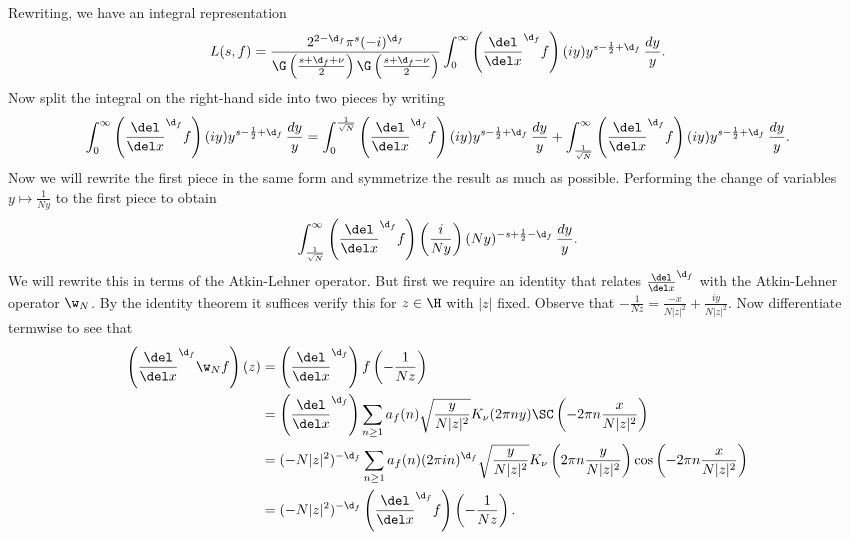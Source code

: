       Rewriting, we have an integral representation
      \begin{equation}\label{equ:integral_representation_Maass_1}
        L(s,f) = \frac{2^{2-\d_{f}}\pi^{s}(-i)^{\d_{f}}}{\G\left(\frac{s+\d_{f}+\nu}{2}\right)\G\left(\frac{s+\d_{f}-\nu}{2}\right)}\int_{0}^{\infty}\left(\frac{\del}{\del x}^{\d_{f}}f\right)(iy)y^{s-\frac{1}{2}+\d_{f}}\,\frac{dy}{y}.
      \end{equation}
      Now split the integral on the right-hand side into two pieces by writing
      \begin{equation}\label{equ:symmetric_integral_Maass_split}
        \int_{0}^{\infty}\left(\frac{\del}{\del x}^{\d_{f}}f\right)(iy)y^{s-\frac{1}{2}+\d_{f}}\,\frac{dy}{y} = \int_{0}^{\frac{1}{\sqrt{N}}}\left(\frac{\del}{\del x}^{\d_{f}}f\right)(iy)y^{s-\frac{1}{2}+\d_{f}}\,\frac{dy}{y}+\int_{\frac{1}{\sqrt{N}}}^{\infty}\left(\frac{\del}{\del x}^{\d_{f}}f\right)(iy)y^{s-\frac{1}{2}+\d_{f}}\,\frac{dy}{y}.
      \end{equation}
      Now we will rewrite the first piece in the same form and symmetrize the result as much as possible. Performing the change of variables $y \mapsto \frac{1}{Ny}$ to the first piece to obtain
      \[
        \int_{\frac{1}{\sqrt{N}}}^{\infty}\left(\frac{\del}{\del x}^{\d_{f}}f\right)\left(\frac{i}{Ny}\right)(Ny)^{-s+\frac{1}{2}-\d_{f}}\,\frac{dy}{y}.
      \]
      We will rewrite this in terms of the Atkin-Lehner operator. But first we require an identity that relates $\frac{\del}{\del x}^{\d_{f}}$ with the Atkin-Lehner operator $\w_{N}$. By the identity theorem it suffices verify this for $z \in \H$ with $|z|$ fixed. Observe that $-\frac{1}{Nz} = \frac{-x}{N|z|^{2}}+\frac{iy}{N|z|^{2}}$. Now differentiate termwise to see that
      \begin{align*}
        \left(\frac{\del}{\del x}^{\d_{f}}\w_{N}f\right)(z) &= \left(\frac{\del}{\del x}^{\d_{f}}\right)f\left(-\frac{1}{Nz}\right) \\
         &= \left(\frac{\del}{\del x}^{\d_{f}}\right)\sum_{n \ge 1}a_{f}(n)\sqrt{\frac{y}{N|z|^{2}}}K_{\nu}(2\pi ny)\SC\left(-2\pi n\frac{x}{N|z|^{2}}\right) \\
        &= (-N|z|^{2})^{-\d_{f}}\sum_{n \ge 1}a_{f}(n)(2\pi in)^{\d_{f}}\sqrt{\frac{y}{N|z|^{2}}}K_{\nu}\left(2\pi n\frac{y}{N|z|^{2}}\right)\cos\left(-2\pi n\frac{x}{N|z|^{2}}\right) \\
        &= (-N|z|^{2})^{-\d_{f}}\left(\frac{\del}{\del x}^{\d_{f}}f\right)\left(-\frac{1}{Nz}\right).
      \end{align*}
